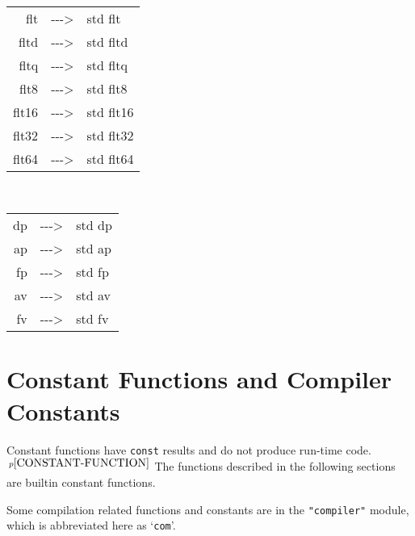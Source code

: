 \documentclass[12pt]{article}
\newcommand{\ABV}{-{}-{}->}
\newcommand{\pagnote}[1]{$\,^{p\pageref{#1}}$}
\begin{document}
\begin{center}
\begin{tabular}{rcl}
\end{tabular}
\\[1ex]
\begin{tabular}{rcl}
flt		& \ABV & std flt \\
fltd		& \ABV & std fltd \\
fltq		& \ABV & std fltq \\
flt8		& \ABV & std flt8 \\
flt16		& \ABV & std flt16 \\
flt32		& \ABV & std flt32 \\
flt64		& \ABV & std flt64 \\
\end{tabular}
\\[1ex]
\begin{tabular}{rcl}
dp		& \ABV & std dp \\
ap		& \ABV & std ap \\
fp		& \ABV & std fp \\
av		& \ABV & std av \\
fv		& \ABV & std fv \\
\end{tabular}
\end{center}

\section{Constant Functions and Compiler Constants}

Constant functions have {\tt const} results
and do not produce run-time code.\pagnote{CONSTANT-FUNCTION}
The functions described in the
following sections are builtin constant functions.

Some compilation related functions and
constants are in the {\tt "compiler"} module,
which is abbreviated here as `{\tt com}'.
\end{document}
